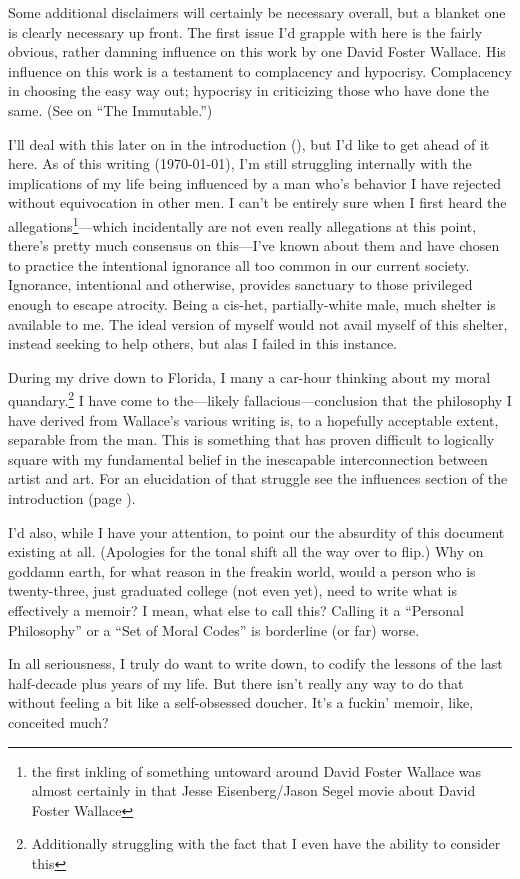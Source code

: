 \vspace*{\fill}
{\normalsize Some additional disclaimers will certainly be necessary overall, but a blanket one is clearly necessary up front.
The first issue I'd grapple with here is the fairly obvious, rather damning influence on this work by one David Foster Wallace.
His influence on this work is a testament to complacency and hypocrisy.
Complacency in choosing the easy way out; hypocrisy in criticizing those who have done the same.
(See  on ``The Immutable.'')

I'll deal with this later on in the introduction (), but I'd like to get ahead of it here.
As of this writing (\today), I'm still struggling internally with the implications of my life being influenced by a man who's behavior I have rejected without equivocation in other men.
I can't be entirely sure when I first heard the allegations\footnote{the first inkling of something untoward around David Foster Wallace was almost certainly in that Jesse Eisenberg/Jason Segel movie about David Foster Wallace}---which incidentally are not even really allegations at this point, there's pretty much consensus on this---I've known about them and have chosen to practice the intentional ignorance all too common in our current society.
Ignorance, intentional and otherwise, provides sanctuary to those privileged enough to escape atrocity.
Being a cis-het, partially-white male, much shelter is available to me.
The ideal version of myself would not avail myself of this shelter, instead seeking to help others, but alas I failed in this instance.

During my drive down to Florida, I many a car-hour thinking about my moral quandary.\footnote{Additionally struggling with the fact that I even have the ability to consider this}
I have come to the---likely fallacious---conclusion that the philosophy I have derived from Wallace's various writing is, to a hopefully acceptable extent, separable from the man.
This is something that has proven difficult to logically square with my fundamental belief in the inescapable interconnection between artist and art.
For an elucidation of that struggle see the influences section of the introduction (page \pageref{sec:influences}).

I'd also, while I have your attention, to point our the absurdity of this document existing at all.
(Apologies for the tonal shift all the way over to flip.)
Why on goddamn earth, for what reason in the freakin world, would a person who is twenty-three, just graduated college (not even yet), need to write what is effectively a memoir?
I mean, what else to call this?
Calling it a ``Personal Philosophy'' or a ``Set of Moral Codes'' is borderline (or far) worse.

In all seriousness, I truly do want to write down, to codify the lessons of the last half-decade plus years of my life.
But there isn't really any way to do that without feeling a bit like a self-obsessed doucher.
It's a fuckin' memoir, like, conceited much?}

